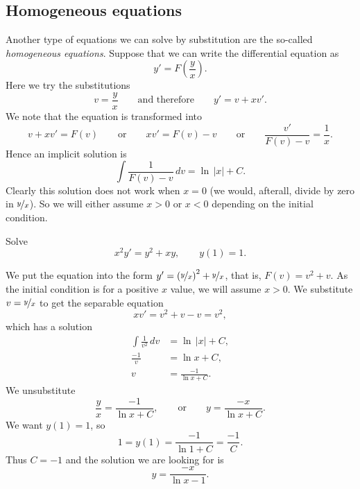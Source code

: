 \subsection{Homogeneous equations}

Another type of equations we can solve by substitution are the 
so-called \emph{homogeneous equations}.
Suppose that we can write the differential equation as
\begin{equation*}
y' = F\left(\frac{y}{x}\right) .
\end{equation*}
Here we try the substitutions
\begin{equation*}
v = \frac{y}{x} \qquad \text{and therefore} \qquad y' = v + x v' .
\end{equation*}
We note that the equation is transformed into
\begin{equation*}
v+ xv' = F(v) \qquad \text{or} \qquad xv' = F(v)-v 
\qquad \text{or} \qquad \frac{v'}{F(v)-v} = \frac{1}{x} .
\end{equation*}
Hence an implicit solution is
\begin{equation*}
\int \frac{1}{F(v)-v} \,dv = \ln \, \lvert x \rvert + C .
\end{equation*}
Clearly this solution does not work when $x = 0$ (we would, afterall,
divide by zero in $\nicefrac{y}{x}$).  So we will either assume $x > 0$
or $x < 0$ depending on the initial condition.

\begin{example}
Solve 
\begin{equation*}
x^2y' = y^2+xy, \qquad y(1)=1.
\end{equation*}

We put the equation into
the form $y'= {\left(\nicefrac{y}{x}\right)}^2+\nicefrac{y}{x}$,
that is, $F(v) = v^2+v$.
As the initial condition is for a positive $x$ value,
we will assume $x > 0$.
We substitute $v=\nicefrac{y}{x}$ to get
the separable equation
\begin{equation*}
xv' = v^2+v-v = v^2 ,
\end{equation*}
which has a solution
\begin{equation*}
\begin{aligned}
\int \frac{1}{v^2} \,dv &= \ln \, \lvert x \rvert + C , \\
\frac{-1}{v} &= \ln  x + C , \\
v &= \frac{-1}{\ln  x  + C} .
\end{aligned}
\end{equation*}
We unsubstitute
\begin{equation*}
\frac{y}{x} = \frac{-1}{\ln  x  + C} ,
\qquad
\text{or}
\qquad
y = \frac{-x}{\ln  x  + C} .
\end{equation*}
We want $y(1)=1$, so 
\begin{equation*}
1 = y(1) = \frac{-1}{\ln  1 + C} = \frac{-1}{C} .
\end{equation*}
Thus $C = -1$ and
the solution we are looking for is
\begin{equation*}
y = \frac{-x}{\ln  x  -1} .
\end{equation*}
\end{example}

